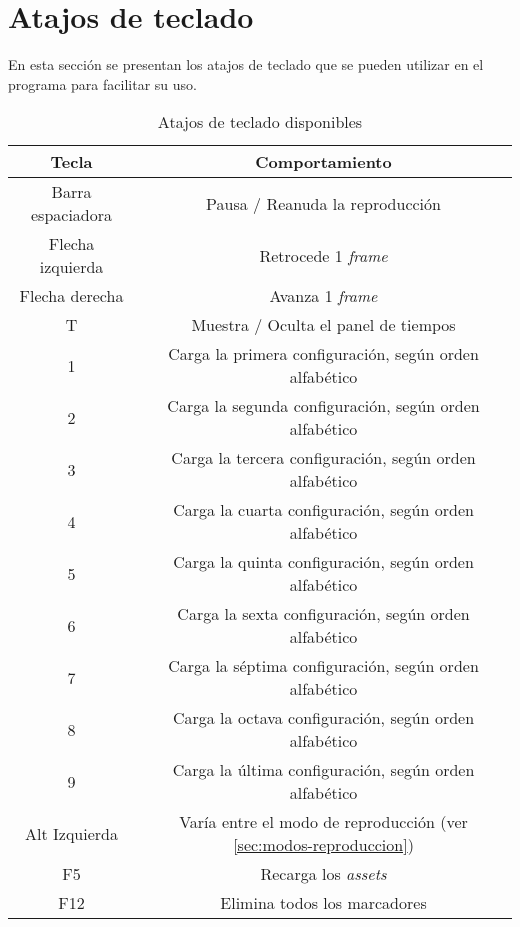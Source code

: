 \chapter{Atajos de teclado} \label{apx:keyboard-shortcut}

En esta sección se presentan los atajos de teclado que se pueden utilizar en el programa para facilitar su uso.

\begin{table}[H]
    \centering
    \begin{tabular}{c|c}
    \toprule
    {\textbf{Tecla}} & {\textbf{Comportamiento}} \\
    \midrule
    Barra espaciadora & Pausa / Reanuda la reproducción \\
    Flecha izquierda & Retrocede 1 \textit{frame} \\
    Flecha derecha & Avanza 1 \textit{frame} \\
    T & Muestra / Oculta el panel de tiempos \\
    1 & Carga la primera configuración, según orden alfabético \\
    2 & Carga la segunda configuración, según orden alfabético \\
    3 & Carga la tercera configuración, según orden alfabético \\
    4 & Carga la cuarta configuración, según orden alfabético \\
    5 & Carga la quinta configuración, según orden alfabético \\
    6 & Carga la sexta configuración, según orden alfabético \\
    7 & Carga la séptima configuración, según orden alfabético \\
    8 & Carga la octava configuración, según orden alfabético \\
    9 & Carga la última configuración, según orden alfabético \\
    Alt Izquierda & Varía entre el modo de reproducción (ver \ref{sec:modos-reproduccion}) \\
    F5 & Recarga los \textit{assets} \\
    F12 & Elimina todos los marcadores \\
    \bottomrule
    \end{tabular}
    \caption{Atajos de teclado disponibles}
    \label{tab:keyboard-shortcut}
  \end{table}